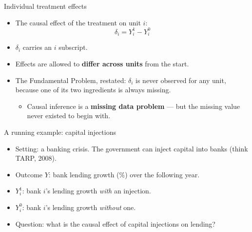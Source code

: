 \documentclass[
  11pt,
  ignorenonframetext,
  aspectratio=169,
]{beamer}
\providecommand{\tightlist}{%
  \setlength{\itemsep}{0pt}\setlength{\parskip}{0pt}}
\begin{document}
\begin{frame}{Individual treatment effects}
\protect{}\label{individual-treatment-effects}
\begin{itemize}
\tightlist
\item
  The causal effect of the treatment on unit \(i\): \[
  \delta_i = Y_i^1 - Y_i^0
  \]
\item
  \(\delta_i\) carries an \(i\) subscript.
\item
  Effects are allowed to \textbf{differ across units} from the start.
\item
  The Fundamental Problem, restated: \(\delta_i\) is never observed for
  any unit, because one of its two ingredients is always missing.

  \begin{itemize}
  \tightlist
  \item
    Causal inference is a \textbf{missing data problem} --- but the
    missing value never existed to begin with.
  \end{itemize}
\end{itemize}
\end{frame}

\begin{frame}{A running example: capital injections}
\protect{}\label{a-running-example-capital-injections}
\begin{itemize}
\tightlist
\item
  Setting: a banking crisis. The government can inject capital into
  banks (think TARP, 2008).
\item
  Outcome \(Y\): bank lending growth (\%) over the following year.
\item
  \(Y_i^1\): bank \(i\)'s lending growth \emph{with} an injection.
\item
  \(Y_i^0\): bank \(i\)'s lending growth \emph{without} one.
\item
  Question: what is the causal effect of capital injections on lending?
\end{itemize}
\end{frame}
\end{document}
